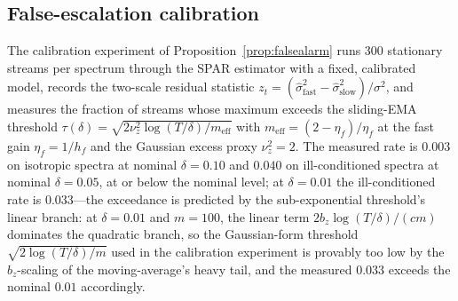\subsection{False-escalation calibration}
The calibration experiment of Proposition~\ref{prop:falsealarm} runs 300 stationary streams per spectrum through the SPAR estimator with a fixed, calibrated model, records the two-scale residual statistic $z_t = (\widehat\sigma^2_{\mathrm{fast}} - \widehat\sigma^2_{\mathrm{slow}})/\sigma^2$, and measures the fraction of streams whose maximum exceeds the sliding-EMA threshold $\tau(\delta) = \sqrt{2\nu_z^2\log(T/\delta)/m_{\mathrm{eff}}}$ with $m_{\mathrm{eff}} = (2-\eta_f)/\eta_f$ at the fast gain $\eta_f = 1/h_f$ and the Gaussian excess proxy $\nu_z^2 = 2$.
The measured rate is $0.003$ on isotropic spectra at nominal $\delta = 0.10$ and $0.040$ on ill-conditioned spectra at nominal $\delta = 0.05$, at or below the nominal level; at $\delta = 0.01$ the ill-conditioned rate is $0.033$---the exceedance is predicted by the sub-exponential threshold's linear branch: at $\delta = 0.01$ and $m = 100$, the linear term $2 b_z \log(T/\delta)/(cm)$ dominates the quadratic branch, so the Gaussian-form threshold $\sqrt{2\log(T/\delta)/m}$ used in the calibration experiment is provably too low by the $b_z$-scaling of the moving-average's heavy tail, and the measured $0.033$ exceeds the nominal $0.01$ accordingly.

